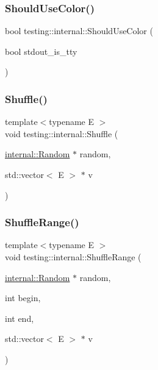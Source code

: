 \mbox{\label{namespacetesting_1_1internal_ac1db1b4603967a6c4404f31cbbac31a6}} 
\subsubsection{\texorpdfstring{Should\+Use\+Color()}{ShouldUseColor()}}
{\footnotesize\ttfamily bool testing\+::internal\+::\+Should\+Use\+Color (\begin{DoxyParamCaption}\item[{bool}]{stdout\+\_\+is\+\_\+tty }\end{DoxyParamCaption})}

\mbox{\label{namespacetesting_1_1internal_a90d9e6ffe8522a7eb1b2ce9b1a0c4673}} 
\subsubsection{\texorpdfstring{Shuffle()}{Shuffle()}}
{\footnotesize\ttfamily template$<$typename E $>$ \\
void testing\+::internal\+::\+Shuffle (\begin{DoxyParamCaption}\item[{\hyperlink{classtesting_1_1internal_1_1_random}{internal\+::\+Random} $\ast$}]{random,  }\item[{std\+::vector$<$ E $>$ $\ast$}]{v }\end{DoxyParamCaption})\hspace{0.3cm}{\ttfamily [inline]}}

\mbox{\label{namespacetesting_1_1internal_a0e1d3dc36138a591769412d4c7779861}} 
\subsubsection{\texorpdfstring{Shuffle\+Range()}{ShuffleRange()}}
{\footnotesize\ttfamily template$<$typename E $>$ \\
void testing\+::internal\+::\+Shuffle\+Range (\begin{DoxyParamCaption}\item[{\hyperlink{classtesting_1_1internal_1_1_random}{internal\+::\+Random} $\ast$}]{random,  }\item[{int}]{begin,  }\item[{int}]{end,  }\item[{std\+::vector$<$ E $>$ $\ast$}]{v }\end{DoxyParamCaption})}

